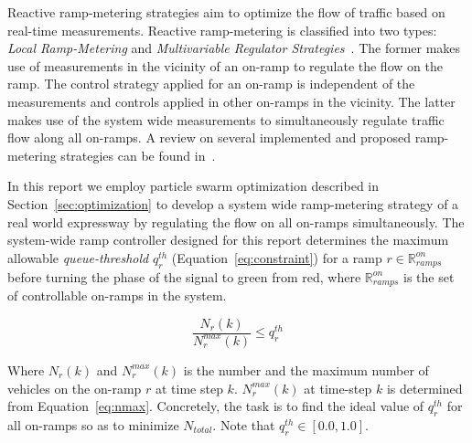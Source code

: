 \documentclass[12pt]{article}
\begin{document}
Reactive ramp-metering strategies aim to optimize the flow of traffic based on real-time measurements. Reactive ramp-metering is classified into two types: {\it Local Ramp-Metering} and {\it Multivariable Regulator Strategies}~\cite{papageorgiou2003review}. The former makes use of measurements in the vicinity of an on-ramp to regulate the flow on the ramp. The control strategy applied for an on-ramp is independent of the measurements and controls applied in other on-ramps in the vicinity. The latter makes use of the system wide measurements to simultaneously regulate traffic flow along all on-ramps. A review on several implemented and proposed ramp-metering strategies can be found in~\cite{bogenberger1999advanced}.

In this report we employ particle swarm optimization described in Section~\ref{sec:optimization} to develop a system wide ramp-metering strategy of a real world expressway by regulating the flow on all on-ramps simultaneously. The system-wide ramp controller designed for this report determines the maximum allowable {\it queue-threshold} $q^{th}_r$ (Equation~\ref{eq:constraint}) for a ramp $r\in \mathbb{R}^{on}_{ramps}$ before turning the phase of the signal to green from red, where $\mathbb{R}^{on}_{ramps}$ is the set of controllable on-ramps in the system.

\begin{equation}
 \label{eq:constraint}
\frac{N_r(k)}{N^{max}_r(k)}\le q^{th}_r
 \end{equation}

 Where $N_r(k)$ and $N^{max}_r(k)$ is the number and the maximum number of vehicles on the on-ramp $r$ at time step $k$. $N^{max}_r(k)$ at time-step $k$ is determined from Equation~\ref{eq:nmax}. Concretely, the task is to find the ideal value of $q^{th}_r$ for all on-ramps so as to minimize $N_{total}$. Note that $q^{th}_r \in [0.0,1.0]$.
\end{document}
